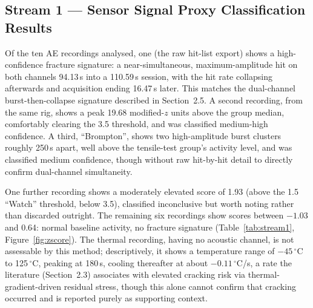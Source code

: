 \documentclass[a4paper]{article}
\begin{document}
\subsection{Stream 1 --- Sensor Signal Proxy Classification Results}
Of the ten AE recordings analysed, one (the raw hit-list export) shows a high-confidence fracture signature: a near-simultaneous, maximum-amplitude hit on both channels 94.13\,s into a 110.59\,s session, with the hit rate collapsing afterwards and acquisition ending 16.47\,s later. This matches the dual-channel burst-then-collapse signature described in Section~2.5. A second recording, from the same rig, shows a peak 19.68 modified-$z$ units above the group median, comfortably clearing the 3.5 threshold, and was classified medium-high confidence. A third, ``Brompton'', shows two high-amplitude burst clusters roughly 250\,s apart, well above the tensile-test group's activity level, and was classified medium confidence, though without raw hit-by-hit detail to directly confirm dual-channel simultaneity.

One further recording shows a moderately elevated score of 1.93 (above the 1.5 ``Watch'' threshold, below 3.5), classified inconclusive but worth noting rather than discarded outright. The remaining six recordings show scores between $-1.03$ and 0.64: normal baseline activity, no fracture signature (Table~\ref{tab:stream1}, Figure~\ref{fig:zscore}). The thermal recording, having no acoustic channel, is not assessable by this method; descriptively, it shows a temperature range of $-45$\,$^\circ$C to 125\,$^\circ$C, peaking at 180\,s, cooling thereafter at about $-0.11\,^\circ$C/s, a rate the literature (Section~2.3) associates with elevated cracking risk via thermal-gradient-driven residual stress, though this alone cannot confirm that cracking occurred and is reported purely as supporting context.
\end{document}
